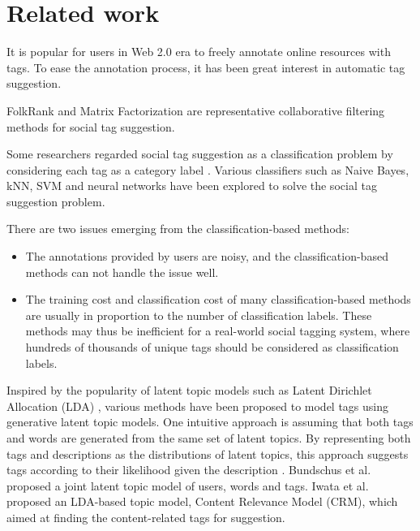 \documentclass[11pt]{article} %
\begin{document}
\section{Related work}

It is popular for users in Web 2.0 era to freely annotate online resources with tags. To ease the annotation process, it has been great interest in automatic tag suggestion.

FolkRank \cite{jaschke2008tag} and Matrix Factorization \cite{rendle2009learning} are representative collaborative filtering methods for social tag suggestion.

Some researchers regarded social tag suggestion as a classification problem by considering each tag as a category label \cite{ohkura2006browsing, mishne2006autotag, lee2007automatic, katakis2008multilabel, fujimura2007blogosonomy, heymann2008social}. Various classifiers such as Naive Bayes, kNN, SVM and neural networks have been explored to solve the social tag suggestion problem.

There are two issues emerging from the classification-based methods:

\begin{itemize}

\item The annotations provided by users are noisy, and the classification-based methods can not handle the issue well.

\item The training cost and classification cost of many classification-based methods are usually in proportion to the number of classification labels. These methods may thus be inefficient for a real-world social tagging system, where hundreds of thousands of unique tags should be considered as classification labels.

\end{itemize}

Inspired by the popularity of latent topic models such as Latent Dirichlet Allocation (LDA) \cite{blei2003modeling}, various methods have been proposed to model tags using generative latent topic models. One intuitive approach is assuming that both tags and words are generated from the same set of latent topics. By representing both tags and descriptions as the distributions of latent topics, this approach suggests tags according to their likelihood given the description \cite{krestel2009latent, liu2009clustering}. Bundschus et al. \cite{bundschus2009hierarchical} proposed a joint latent topic model of users, words and tags. Iwata et al. \cite{iwata2009modeling} proposed an LDA-based topic model, Content Relevance Model (CRM), which aimed at finding the content-related tags for suggestion.
\end{document}
